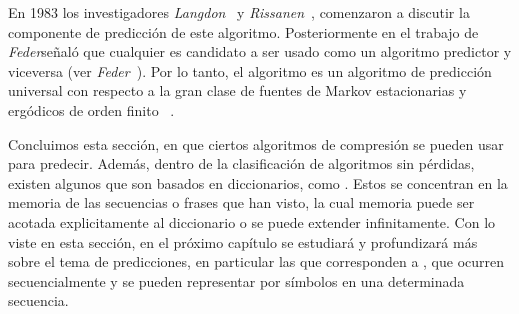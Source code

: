 En 1983 los investigadores \emph{Langdon}~\cite{Langdon1983} y \emph{Rissanen}~\cite{Rissanen1983}, comenzaron a discutir la componente de predicción de este algoritmo. Posteriormente en el trabajo de \emph{Feder}\etal señaló que cualquier \LDC es candidato a ser usado como un algoritmo predictor y viceversa (ver \emph{Feder}\etal~\cite{Feder1992}). Por lo tanto, el algoritmo \lzSieteOcho es un algoritmo de predicción universal con respecto a la gran clase de fuentes de Markov estacionarias y ergódicos de orden finito ~\cite{Begleiter2004}.

	




\uncm
Concluimos esta sección, en que ciertos algoritmos de compresión se pueden usar para predecir. Además, dentro de la clasificación de algoritmos sin pérdidas, existen algunos que son basados en diccionarios, como \lzSieteOcho. Estos se concentran en la memoria de las secuencias o frases que han visto, la cual memoria puede ser acotada explicitamente al diccionario o se puede extender infinitamente. Con lo viste en esta sección, en el próximo capítulo se estudiará y profundizará más sobre el tema de predicciones, en particular las que corresponden a \webasccesslog, que ocurren secuencialmente y se pueden representar por símbolos en una determinada secuencia.




 